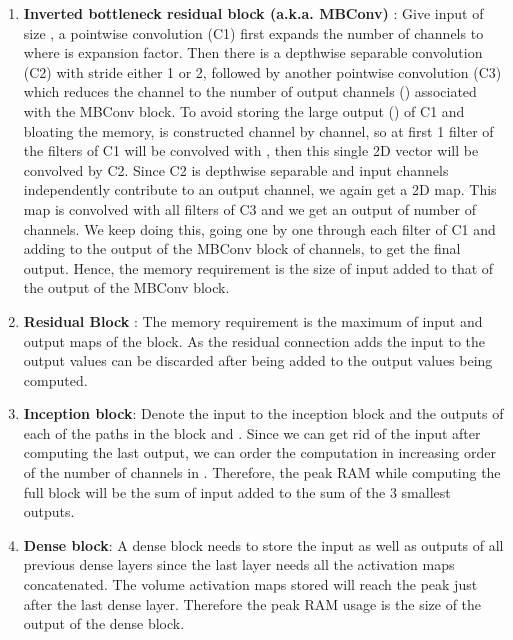 \documentclass[10pt]{article}
\begin{document}
\begin{enumerate}
  \item \textbf{Inverted bottleneck residual block (a.k.a. MBConv)} :
    Give input  of size , a pointwise
    convolution (C1) first expands the number of channels to  where  is expansion factor. Then there is a depthwise
    separable  convolution (C2) with stride either 1 or 2,
    followed by another pointwise convolution (C3) which reduces the
    channel to the number of output channels () associated with the
    MBConv block. To avoid storing the large output () of C1
    and bloating the memory,  is constructed channel by
    channel, so at first 1 filter of the  filters of C1
    will be convolved with , then this single 2D vector will be
    convolved by C2. Since C2 is depthwise separable and input
    channels independently contribute to an output channel, we again
    get a 2D map. This map is convolved with all filters of C3 and we
    get an output of  number of channels. We keep doing this, going
    one by one through each filter of C1 and adding to the output of
    the MBConv block of  channels, to get the final output. Hence,
    the memory requirement is the size of input added to that of the
    output of the MBConv block.
  
  \item \textbf{Residual Block} : The memory requirement is the
    maximum of input and output maps of the block. As the residual connection adds the input to the output values can be discarded after being added to the output values being computed.
  
  \item \textbf{Inception block}: Denote the input to the inception
    block  and the outputs of each of the  paths in the block
     and . Since we can get rid of the input 
    after computing the last output, we can order the computation in increasing order of the number of channels in . Therefore,
    the peak RAM while computing the full block will be the sum of input added to the sum of the 3 smallest outputs.
  
  \item \textbf{Dense block}: A dense block needs to store the input as well as outputs of all previous dense layers since the last layer needs all the activation maps concatenated. The volume activation maps stored will reach the peak just after the last dense layer. Therefore the peak RAM usage is the size of the output of the dense block.
\end{enumerate}
\end{document}
